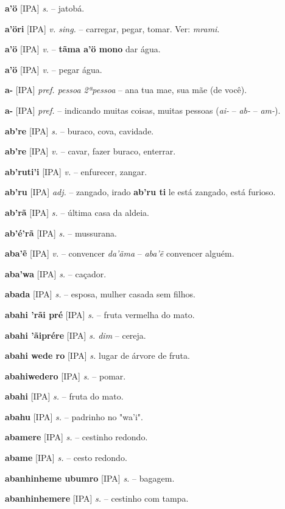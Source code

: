 \textbf{a'ö} [IPA] \textit{s.} -- jatobá.

\textbf{a'öri} [IPA] \textit{v. sing.} -- carregar, pegar, tomar. Ver: \textit{mrami}.

\textbf{a'ö} [IPA] \textit{v.} -- \textbf{tãma a'ö mono} dar água.

\textbf{a'ö} [IPA] \textit{v.} -- pegar água.

\textbf{a-} [IPA] \textit{pref. pessoa 2ªpessoa} -- ana tua mae, sua mãe (de você).

\textbf{a-} [IPA] \textit{pref.} -- indicando muitas coisas, muitas pessoas (\textit{ai-} -- \textit{ab-} -- \textit{am-}).

\textbf{ab're} [IPA] \textit{s.} -- buraco, cova, cavidade.

\textbf{ab're} [IPA] \textit{v.} -- cavar, fazer buraco, enterrar.

\textbf{ab'ruti'i} [IPA] \textit{v.} -- enfurecer, zangar.

\textbf{ab'ru} [IPA] \textit{adj.} -- zangado, irado \textbf{ab'ru ti} le está zangado, está furioso.

\textbf{ab'rã} [IPA] \textit{s.} -- última casa da aldeia.

\textbf{ab'é'rã} [IPA] \textit{s.} -- mussurana.

\textbf{aba'ẽ} [IPA] \textit{v.} -- convencer  \textit{da'ãma} -- \textit{aba'ẽ} convencer alguém.

\textbf{aba'wa} [IPA] \textit{s.} -- caçador.

\textbf{abada} [IPA] \textit{s.} -- esposa, mulher casada sem filhos.

\textbf{abahi 'rãi pré} [IPA] \textit{s.} -- fruta vermelha do mato.

\textbf{abahi 'ãiprére} [IPA] \textit{s. dim} -- cereja.

\textbf{abahi wede ro} [IPA] \textit{s.} lugar de árvore de fruta.

\textbf{abahiwedero} [IPA] \textit{s.} -- pomar.

\textbf{abahi} [IPA] \textit{s.} -- fruta do mato.

\textbf{abahu} [IPA] \textit{s.} -- padrinho no "wa'i".

\textbf{abamere} [IPA] \textit{s.} -- cestinho redondo.

\textbf{abame} [IPA] \textit{s.} -- cesto redondo.

\textbf{abanhinheme ubumro} [IPA] \textit{s.} -- bagagem.

\textbf{abanhinhemere} [IPA] \textit{s.} -- cestinho com tampa.

